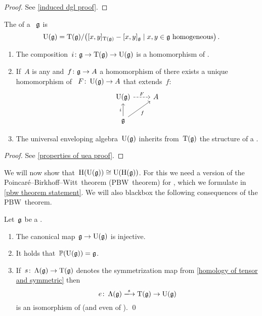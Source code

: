 \documentclass[a4paper,10pt,headings=standardclasses]{scrartcl}
\begin{document}
\begin{proof}
  See \cref{induced dgl proof}.
\end{proof}

\begin{definition}
  The  of a {\dgl}~$\mathfrak{g}$ is
  \[
    \Univ(\glie)
    =
    \dgTensor(\glie)
    /
    \bigl(
      [x,y]_{\dgTensor(\glie)} - [x,y]_{\glie}
    \suchthat
      \text{$x, y \in \glie$ homogeneous}
    \bigr) \,.
  \]
\end{definition}

\begin{proposition}
  \label{properties of uea}
  \leavevmode
  \begin{enumerate}
    \item
      The composition~$i \colon \mathfrak{g} \to \operatorname{T}(\mathfrak{g}) \to \operatorname{U}(\mathfrak{g})$ is a homomorphism of {\dgls}.
    \item
      If~$A$ is any {\dga} and~$f \colon \mathfrak{g} \to A$ a homomorphism of {\dgls} there exists a unique homomorphism of {\dgas}~$F \colon \operatorname{U}(\mathfrak{g}) \to A$ that extends~$f$:
      \[
        \begin{tikzcd}
          \Univ(\glie)
          \arrow[dashed]{r}[above]{F}
          &
          A
          \\
          \glie
          \arrow{u}[left]{i}
          \arrow{ur}[below right]{f}
          &
          {}
        \end{tikzcd}
      \]
    \item
      The universal enveloping algebra~$\operatorname{U}(\mathfrak{g})$ inherits from~$\operatorname{T}(\mathfrak{g})$ the structure of a {\dgh}.
  \end{enumerate}
\end{proposition}

\begin{proof}
  See \cref{properties of uea proof}.
\end{proof}

We will now show that~$\operatorname{H}(\operatorname{U}(\mathfrak{g})) \cong \operatorname{U}(\operatorname{H}(\mathfrak{g}))$.
For this we need a version of the Poincaré–Birkhoff–Witt~theorem (PBW~theorem) for {\dgls}, which we formulate in \cref{pbw theorem statement}.
We will also blackbox the following consequences of the PBW~theorem.

\begin{corollary}
  \label{consequences of pbw}
  Let~$\mathfrak{g}$ be a {\dgl}.
  \begin{enumerate}
    \item
      The canonical map~$\mathfrak{g} \to \operatorname{U}(\mathfrak{g})$ is injective.
    \item
      It holds that~$\mathbb{P}(\operatorname{U}(\mathfrak{g})) = \mathfrak{g}$.
    \item
      If~$s \colon \operatorname{\Lambda}(\mathfrak{g}) \to \operatorname{T}(\mathfrak{g})$ denotes the symmetrization map from \cref{homology of tensor and symmetric} then
      \[
        e
        \colon
        \dgSymm(\glie)
        \xlongto{s}
        \dgTensor(\glie)
        \to
        \Univ(\glie)
      \]
      is an isomorphism of {\dgvs} (and even of {\dgc}).
    \qed
  \end{enumerate}
\end{corollary}
\end{document}

